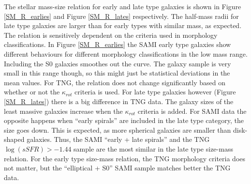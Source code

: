 The stellar mass-size relation for early and late type galaxies is shown in Figure \ref{SM_R_earlies} and Figure \ref{SM_R_lates} respectively. The half-mass radii for late type galaxies are larger than for early types with similar mass, as expected. The relation is sensitively dependent on the criteria used in morphology classifications. In Figure \ref{SM_R_earlies} the SAMI early type galaxies show different behaviours for different morphology classifications in the low mass range. Including the S0 galaxies smoothes out the curve. The galaxy sample is very small in this range though, so this might just be statistical deviations in the mean values. For TNG, the relation does not change significantly based on whether or not the $\kappa_{rot}$ criteria is used. 
For late type galaxies however (Figure \ref{SM_R_lates}) there is a big difference in TNG data. The galaxy sizes of the least massive galaxies increase when the $\kappa_{rot}$ criteria is added. For SAMI data the opposite happens when ``early spirals'' are included in the late type category, the size goes down. This is expected, as more spherical galaxies are smaller than disk-shaped galaxies. Thus, the SAMI ``early + late spirals'' and the TNG $\log(sSFR) > -1.44$ sample are the most similar in the late type size-mass relation. For the early type size-mass relation, the TNG morphology criteria does not matter, but the ``elliptical + S0'' SAMI sample matches better the TNG data.



